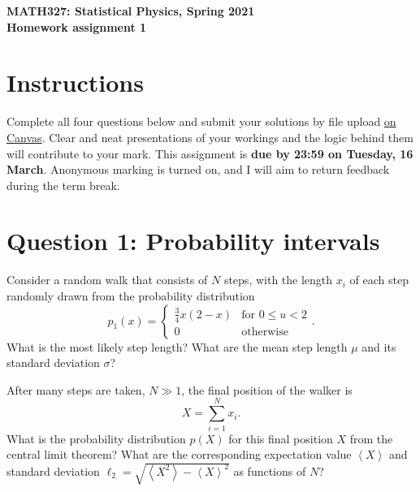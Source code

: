 \documentclass[12 pt]{article} %
\newcommand{\si}{\ensuremath{\sigma} }
\newcommand{\vev}[1]{\ensuremath{\left\langle #1 \right\rangle} }
\newcommand{\showmarks}[1]{\rightline{\texttt{[#1 marks]}}} %
\begin{document}
\newcommand{\thisweek}{MATH327 Homework 1}
\newcommand{\moddate}{Last modified 4 Mar.~2021}
\begin{center}
  {\Large \textbf{MATH327: Statistical Physics, Spring 2021}} \\[12 pt]
  {\Large \textbf{Homework assignment 1}} \\[24 pt]
\end{center}

\section*{Instructions}
Complete all four questions below and submit your solutions by file upload \href{https://liverpool.instructure.com/courses/19478/assignments/89667}{on Canvas}.
Clear and neat presentations of your workings and the logic behind them will contribute to your mark.
This assignment is \textbf{due by 23:59 on Tuesday, 16 March}.
Anonymous marking is turned on, and I will aim to return feedback during the term break.



\section*{Question 1: Probability intervals}
Consider a random walk that consists of $N$ steps, with the length $x_i$ of each step randomly drawn from the probability distribution
\begin{equation*}
  p_1(x) = \left\{\begin{array}{ll}\frac{3}{4} x (2 - x) & \mbox{for } 0 \leq u < 2 \\
                                   0                     & \mbox{otherwise}\end{array}\right. .
\end{equation*}
What is the most likely step length?
What are the mean step length $\mu$ and its standard deviation $\si$?

\showmarks{3}

After many steps are taken, $N \gg 1$, the final position of the walker is
\begin{equation*}
  X = \sum_{i = 1}^N x_i.
\end{equation*}
What is the probability distribution $p(X)$ for this final position $X$ from the central limit theorem?
What are the corresponding expectation value $\vev{X}$ and standard deviation $\ell_2 = \sqrt{\vev{X^2} - \vev{X}^2}$ as functions of $N$?
\end{document}
